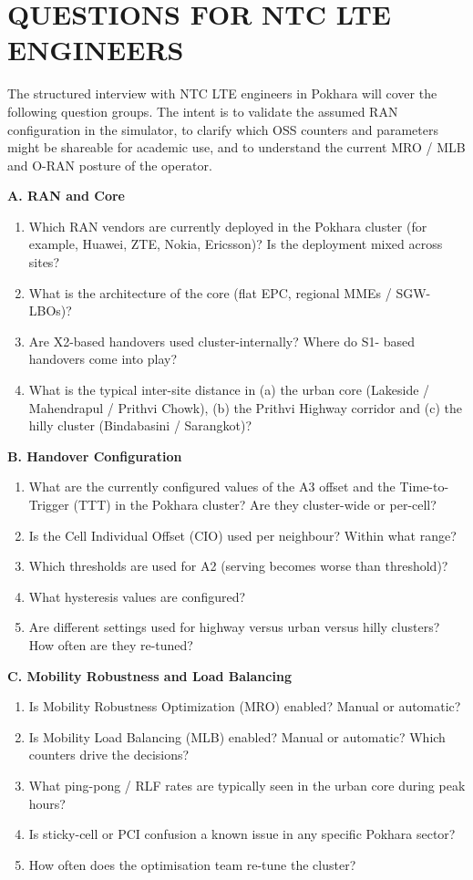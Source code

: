 \documentclass[12pt,a4paper,oneside]{report}
\begin{document}
\chapter{QUESTIONS FOR NTC LTE ENGINEERS}

The structured interview with NTC LTE engineers in Pokhara will cover
the following question groups. The intent is to validate the assumed
RAN configuration in the simulator, to clarify which OSS counters and
parameters might be shareable for academic use, and to understand the
current MRO / MLB and O-RAN posture of the operator.

\textbf{A. RAN and Core}
\begin{enumerate}[leftmargin=*]
    \item Which RAN vendors are currently deployed in the Pokhara
    cluster (for example, Huawei, ZTE, Nokia, Ericsson)? Is the
    deployment mixed across sites?
    \item What is the architecture of the core (flat EPC, regional
    MMEs / SGW-LBOs)?
    \item Are X2-based handovers used cluster-internally? Where do S1-
    based handovers come into play?
    \item What is the typical inter-site distance in (a) the urban
    core (Lakeside / Mahendrapul / Prithvi Chowk), (b) the Prithvi
    Highway corridor and (c) the hilly cluster
    (Bindabasini / Sarangkot)?
\end{enumerate}

\textbf{B. Handover Configuration}
\begin{enumerate}[leftmargin=*,resume]
    \item What are the currently configured values of the A3 offset
    and the Time-to-Trigger (TTT) in the Pokhara cluster? Are they
    cluster-wide or per-cell?
    \item Is the Cell Individual Offset (CIO) used per neighbour?
    Within what range?
    \item Which thresholds are used for A2 (serving becomes worse than
    threshold)?
    \item What hysteresis values are configured?
    \item Are different settings used for highway versus urban
    versus hilly clusters? How often are they re-tuned?
\end{enumerate}

\textbf{C. Mobility Robustness and Load Balancing}
\begin{enumerate}[leftmargin=*,resume]
    \item Is Mobility Robustness Optimization (MRO) enabled? Manual or
    automatic?
    \item Is Mobility Load Balancing (MLB) enabled? Manual or
    automatic? Which counters drive the decisions?
    \item What ping-pong / RLF rates are typically seen in the urban
    core during peak hours?
    \item Is sticky-cell or PCI confusion a known issue in any
    specific Pokhara sector?
    \item How often does the optimisation team re-tune the cluster?
\end{enumerate}
\end{document}
